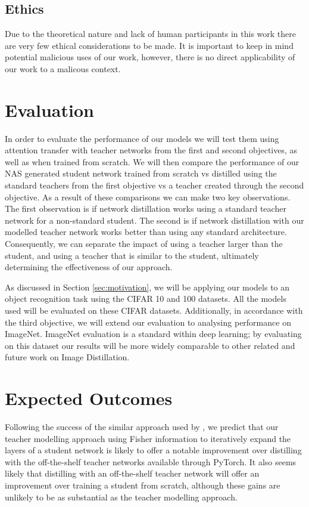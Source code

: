 \documentclass[a4paper,11pt]{article}
\begin{document}
\subsection{Ethics}
Due to the theoretical nature and lack of human participants in this work there are very few ethical considerations to be made. It is important to keep in mind potential malicious uses of our work, however, there is no direct applicability of our work to a malicous context.

\section{Evaluation}
\label{sec:evaluation}
In order to evaluate the performance of our models we will test them using attention transfer with teacher networks from the first and second objectives, as well as when trained from scratch. We will then compare the performance of our NAS generated student network trained from scratch vs distilled using the standard teachers from the first objective vs a teacher created through the second objective. As a result of these comparisons we can make two key observations. The first observation is if network distillation works using a standard teacher network for a non-standard student. The second is if network distillation with our modelled teacher network works better than using any standard architecture. Consequently, we can separate the impact of using a teacher larger than the student, and using a teacher that is similar to the student, ultimately determining the effectiveness of our approach.

As discussed in Section \ref{sec:motivation}, we will be applying our models to an object recognition task using the CIFAR 10 and 100 datasets. All the models used will be evaluated on these CIFAR datasets. Additionally, in accordance with the third objective, we will extend our evaluation to analysing performance on ImageNet. ImageNet evaluation is a standard within deep learning; by evaluating on this dataset our results will be more widely comparable to other related and future work on Image Distillation. 



\section{Expected Outcomes}
\label{sec:outcomes}
Following the success of the similar approach used by \cite{turner2019distilling}, we predict that our teacher modelling approach using Fisher information to iteratively expand the layers of a student network is likely to offer a notable improvement over distilling with the off-the-shelf teacher networks available through PyTorch. It also seems likely that distilling with an off-the-shelf teacher network will offer an improvement over training a student from scratch, although these gains are unlikely to be as substantial as the teacher modelling approach.
\end{document}

